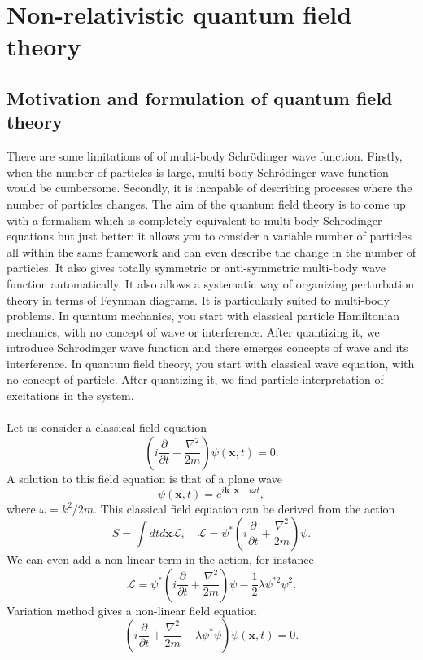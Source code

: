 \section{Non-relativistic quantum field theory}
\subsection{Motivation and formulation of quantum field theory}
There are some limitations of of multi-body Schr\"{o}dinger wave function. Firstly, when the number of particles is large, multi-body Schr\"{o}dinger wave function would be cumbersome. Secondly, it is incapable of describing processes where the number of particles changes.
The aim of the quantum field theory is to come up with a formalism which is completely equivalent to multi-body Schr\"{o}dinger equations but just better:
it allows you to consider a variable number of particles all within the same framework and can even describe the change in the number of particles. 
It also gives totally symmetric or anti-symmetric multi-body wave function automatically. 
It also allows a systematic way of organizing perturbation theory in terms of Feynman diagrams.
It is particularly suited to multi-body problems.
In quantum mechanics, you start with classical particle Hamiltonian mechanics, with no concept of wave or interference. After quantizing it, we introduce Schr\"{o}dinger wave function and there emerges concepts of wave and its interference. 
In quantum field theory, you start with classical wave equation, with no concept of particle. After quantizing it, we find particle interpretation of excitations in the system.
\\ \\
Let us consider a classical field equation
\[\left (i\frac{\partial }{\partial t} + \frac{\nabla^2}{2m}\right ) \psi(\bm{x},t) = 0.\]
A solution to this field equation is that of a plane wave
\[\psi(\bm{x},t) = e^{i\bm{k}\cdot\bm{x} - i\omega t},\]
where $\omega = {k^2}/{2m}$. This classical field equation can be derived from the action
\[S = \int dt d\bm{x} \mathcal{L} , \quad \mathcal{L} = \psi^{*}\left (i\frac{\partial }{\partial t} + \frac{\nabla^2}{2m}\right ) \psi.\]
We can even add a non-linear term in the action, for instance
\[\mathcal{L} = \psi^{*}\left (i\frac{\partial }{\partial t} + \frac{\nabla^2}{2m}\right )\psi - \frac{1}{2}\lambda \psi^{*2}\psi^2.\]
Variation method gives a non-linear field equation
\[\left (i\frac{\partial }{\partial t} + \frac{\nabla^2}{2m} -\lambda \psi^*\psi\right) \psi(\bm{x},t) = 0.\]\\

